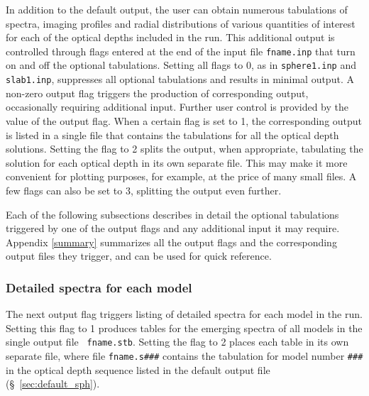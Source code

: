 \documentclass[11pt]{article}
\begin{document}
In addition to the default output, the user can obtain numerous
tabulations of spectra, imaging profiles and radial distributions of
various quantities of interest for each of the optical depths included
in the run. This additional output is controlled through flags entered
at the end of the input file {\tt fname.inp} that turn on and off the
optional tabulations.  Setting all flags to 0, as in {\tt sphere1.inp}
and {\tt slab1.inp}, suppresses all optional tabulations and results
in minimal output. A non-zero output flag triggers the production of
corresponding output, occasionally requiring additional input.
Further user control is provided by the value of the output flag. When
a certain flag is set to 1, the corresponding output is listed in a
single file that contains the tabulations for all the optical depth
solutions. Setting the flag to 2 splits the output, when appropriate,
tabulating the solution for each optical depth in its own separate
file. This may make it more convenient for plotting purposes, for
example, at the price of many small files.  A few flags can also be
set to 3, splitting the output even further.

Each of the following subsections describes in detail the optional
tabulations triggered by one of the output flags and any additional
input it may require.  Appendix \ref{summary} summarizes all the
output flags and the corresponding output files they trigger, and can
be used for quick reference.


\subsubsection {Detailed spectra for each model}
\label{sec:detail_sph}

The next output flag triggers listing of detailed spectra for each
model in the run.  Setting this flag to 1 produces tables for the
emerging spectra of all models in the single output file {\tt
  fname.stb}.  Setting the flag to 2 places each table in its own
separate file, where file {\tt fname.s\#\#\#} contains the tabulation
for model number {\tt \#\#\#} in the optical depth sequence listed in
the default output file (\S~\ref{sec:default_sph}).
\end{document}
